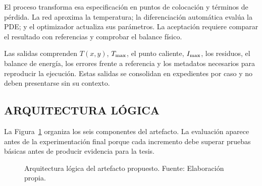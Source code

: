 El proceso transforma esa especificación en puntos de colocación y términos de pérdida. La red aproxima la temperatura; la diferenciación automática evalúa la PDE; y el optimizador actualiza sus parámetros. La aceptación requiere comparar el resultado con referencias y comprobar el balance físico.

Las salidas comprenden $T(x,y)$, $T_{\max}$, el punto caliente, $I_{\max}$, los residuos, el balance de energía, los errores frente a referencia y los metadatos necesarios para reproducir la ejecución. Estas salidas se consolidan en expedientes por caso y no deben presentarse sin su contexto.

\subsection{ARQUITECTURA LÓGICA}

La Figura~\ref{fig:arquitectura-artefacto} organiza los seis componentes del artefacto. La evaluación aparece antes de la experimentación final porque cada incremento debe superar pruebas básicas antes de producir evidencia para la tesis.

\begin{figure}[htbp]
\centering
{}
\caption{Arquitectura lógica del artefacto propuesto. Fuente: Elaboración propia.}
\label{fig:arquitectura-artefacto}
\end{figure}

